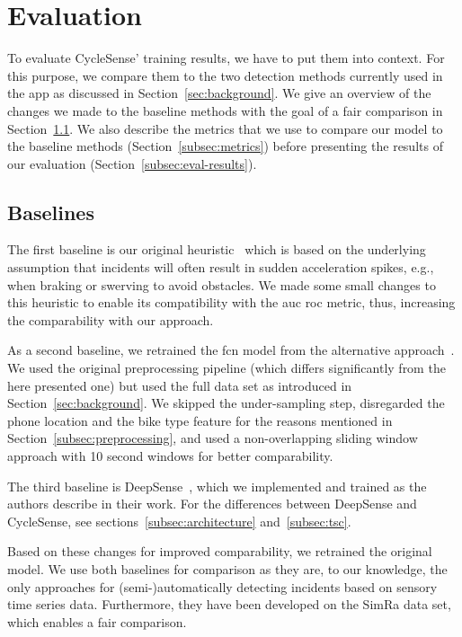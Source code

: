 \section{Evaluation}
\label{sec:evaluation_cyclesense}
To evaluate CycleSense' training results, we have to put them into context. 
For this purpose, we compare them to the two detection methods currently used in the app as discussed in Section~\ref{sec:background}.
We give an overview of the changes we made to the baseline methods with the goal of a fair comparison in Section~\ref{subsec:baselines}.
We also describe the metrics that we use to compare our model to the baseline methods (Section~\ref{subsec:metrics}) before presenting the results of our evaluation (Section~\ref{subsec:eval-results}).


\subsection{Baselines}
\label{subsec:baselines}
The first baseline is our original heuristic~\cite{karakaya2020simra} which is based on the underlying assumption that incidents will often result in sudden acceleration spikes, e.g., when braking or swerving to avoid obstacles.
We made some small changes to this heuristic to enable its compatibility with the \ac{auc} \ac{roc} metric, thus, increasing the comparability with our approach.

As a second baseline, we retrained the \ac{fcn} model from the alternative approach~\cite{sanchez2020detecting}.
We used the original preprocessing pipeline (which differs significantly from the here presented one) but used the full data set as introduced in Section~\ref{sec:background}.
We skipped the under-sampling step, disregarded the phone location and the bike type feature for the reasons mentioned in Section~\ref{subsec:preprocessing}, and used a non-overlapping sliding window approach with 10 second windows for better comparability.

The third baseline is DeepSense~\cite{yao2017deepsense}, which we implemented and trained as the authors describe in their work.
For the differences between DeepSense and CycleSense, see sections~\ref{subsec:architecture} and~\ref{subsec:tsc}.

Based on these changes for improved comparability, we retrained the original model.
We use both baselines for comparison as they are, to our knowledge, the only approaches for (semi-)automatically detecting incidents based on sensory time series data.
Furthermore, they have been developed on the SimRa data set, which enables a fair comparison.

